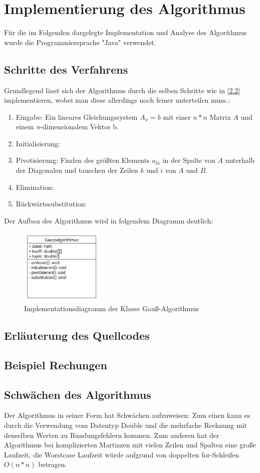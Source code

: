\documentclass[a4paper, 12pt]{report}
\begin{document}
\begin{sloppypar}
\chapter{Implementierung des Algorithmus}
Für die im Folgenden dargelegte Implementation und Analyse des Algorithmus wurde die Programmiersprache "Java" verwendet.
\section{Schritte des Verfahrens}
Grundlegend lässt sich der Algorithmus durch die selben Schritte wie in \ref{2.2} implementieren, wobei man diese allerdings noch feiner unterteilen muss.:
\begin{enumerate}
    \item Eingabe: Ein lineares Gleichungssystem $ A_x=b $ mit einer $ n * n $ Matrix $A$ und einem \textit{n}-dimensionalem Vektor b.
    \item Initialisierung: %
    \item Pivotisierung: Finden des größten Elements $a_{ki}$ in der Spalte von $A$ unterhalb der Diagonalen und tauschen der Zeilen $k$ und $i$ von $A$ und $B$.
    \item Elimination: %
    \item Rückwärtssubstitution: %
\end{enumerate}
Der Aufbau des Algorithmus wird in folgendem Diagramm deutlich:
\begin{figure}[h]
    \centering
    \includegraphics[width=150px]{"./gaussuml.png"}
    \caption{Implementationsdiagramm der Klasse Gauß-Algorithmus}
\end{figure} \newpage
\section{Erläuterung des Quellcodes}


\section{Beispiel Rechungen}
\section{Schwächen des Algorithmus}
Der Algorithmus in seiner Form hat Schwächen aufzuweisen:
Zum einen kann es durch die Verwendung vom Datentyp Double und die mehrfache Rechnung mit denselben Werten zu Rundungsfehlern kommen.
Zum anderen hat der Algorithmus bei komplizierten Martizzen mit vielen Zeilen und Spalten eine große Laufzeit, die Worstcase Laufzeit würde aufgrund von doppelten for-Schleifen $ O(n*n) $ betragen.

\end{sloppypar}
\end{document}
